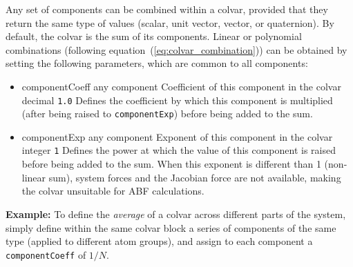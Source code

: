 Any set of components can be combined within a colvar, provided that
they return the same type of values (scalar, unit vector, vector, or
quaternion).  By default, the colvar is the sum of its components.
Linear or polynomial combinations (following
equation~(\ref{eq:colvar_combination})) can be obtained by setting the
following parameters, which are common to all components:
\begin{itemize}
\item %
  \keydef
    {componentCoeff}{%
    any component}{%
    Coefficient of this component in the colvar}{%
    decimal}{%
    \texttt{1.0}}{%
    Defines the coefficient by which this component is multiplied
    (after being raised to \texttt{componentExp}) before being added
    to the sum.}

\item %
  \keydef
    {componentExp}{%
    any component}{%
    Exponent of this component in the colvar}{%
    integer}{%
    \texttt{1}}{%
    Defines the power at which the value of this component is raised
    before being added to the sum.  When this exponent is
    different than 1 (non-linear sum), system forces and the Jacobian
    force are not available, making the colvar unsuitable for ABF calculations.}
\end{itemize}

\textbf{Example:} To define the \emph{average} of a colvar across
different parts of the system, simply define within the same colvar
block a series of components of the same type (applied to different
atom groups), and assign to each component a \texttt{componentCoeff}
of $1/N$.


